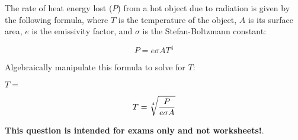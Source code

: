 

The rate of heat energy lost ($P$) from a hot object due to radiation is given by the following formula, where $T$ is the temperature of the object, $A$ is its surface area, $e$ is the emissivity factor, and $\sigma$ is the Stefan-Boltzmann constant:
 
$$P = e \sigma A T^4$$

Algebraically manipulate this formula to solve for $T$:

\vskip 20pt

$T = $







$$T = \root 4 \of {P \over e \sigma A}$$







{\bf This question is intended for exams only and not worksheets!}.



